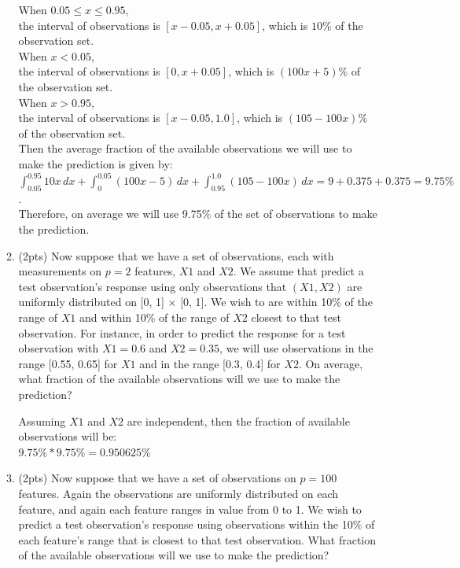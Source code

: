 \documentclass[a4paper]{article}
\theoremstyle{definition}
\newenvironment{soln}{
    \leavevmode\color{blue}\ignorespaces
}{}
\begin{document}
\begin{enumerate}
\begin{enumerate}
	\begin{soln}  When $0.05 \leq x \leq 0.95$, \\ the interval of observations is $[x - 0.05, x + 0.05]$, which is $10\%$ of the observation set. \\ When $x < 0.05$, \\ the interval of observations is $[0, x + 0.05]$, which is $(100x + 5)\%$ of the observation set. \\ When $x > 0.95$, \\ the interval of observations is $[x - 0.05, 1.0]$, which is $(105 - 100x)\%$ of the observation set. \\ Then the average fraction of the available observations we will use to make the prediction is given by: \\ $\int_{0.05}^{0.95} 10x \,dx + \int_{0}^{0.05} (100x - 5) \,dx + \int_{0.95}^{1.0} (105 - 100x) \,dx = 9 + 0.375 + 0.375 = 9.75\%$. \\ Therefore, on average we will use 9.75\% of the set of observations to make the prediction.
        \end{soln}
	
	
	\item (2pts) Now suppose that we have a set of observations, each with measurements on $p =2$ features, $X1$ and $X2$. We assume that predict a test observation’s response using only observations that $(X1,X2)$ are uniformly distributed on [0, 1] × [0, 1]. We wish to are within 10\% of the range of $X1$ and within 10\% of the range of $X2$ closest to that test observation. For instance, in order to predict the response for a test observation with $X1 =0.6$ and $X2 =0.35$, we will use observations in the range [0.55, 0.65] for $X1$ and in the range [0.3, 0.4] for $X2$. On average, what fraction of the available observations will we use to make the prediction?
	
	\begin{soln} Assuming $X1$ and $X2$ are independent, then the fraction of      available observations will be: \\ $9.75\% * 9.75\% = 0.950625\%$ 
        \end{soln}
	
	\item (2pts) Now suppose that we have a set of observations on $p = 100$ features. Again the observations are uniformly distributed on each feature, and again each feature ranges in value from 0 to 1. We wish to predict a test observation’s response using observations within the 10\% of each feature’s range that is closest to that test observation. What fraction of the available observations will we use to make the prediction?
	

\end{enumerate}
\end{enumerate}
\end{document}
